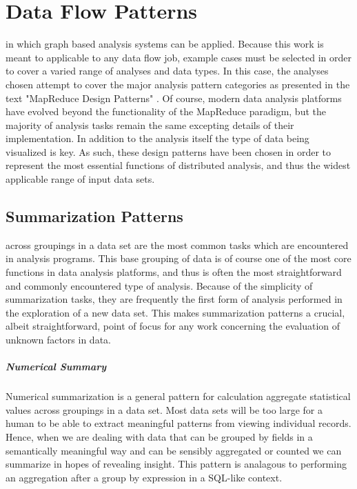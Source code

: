 \chapter{Data Flow Patterns}
\label{sec:dataflowpatterns}
 in which graph based analysis systems can be applied. Because this work is meant to applicable to any data flow job, example cases must be selected in order to cover a varied range of analyses and data types. In this case, the analyses chosen attempt to cover the major analysis pattern categories as presented in the text "MapReduce Design Patterns" \citep{Miner2012}. Of course, modern data analysis platforms have evolved beyond the functionality of the MapReduce paradigm, but the majority of analysis tasks remain the same excepting details of their implementation. In addition to the analysis itself the type of data being visualized is key. As such, these design patterns have been chosen in order to represent the most essential functions of distributed analysis, and thus the widest applicable range of input data sets.

\section{Summarization Patterns}
\label{sec:summarization}
 across groupings in a data set are the most common tasks which are encountered in analysis programs. This base grouping of data is of course one of the most core functions in data analysis platforms, and thus is often the most straightforward and commonly encountered type of analysis. Because of the simplicity of summarization tasks, they are frequently the first form of analysis performed in the exploration of a new data set. This makes summarization patterns a crucial, albeit straightforward, point of focus for any work concerning the evaluation of unknown factors in data.

\paragraph{Numerical Summary}
Numerical summarization is a general pattern for calculation aggregate statistical values across groupings in a data set. Most data sets will be too large for a human to be able to extract meaningful patterns from viewing individual records. Hence, when we are dealing with data that can be grouped by fields in a semantically meaningful way and can be sensibly aggregated or counted we can summarize in hopes of revealing insight. This pattern is analagous to performing an aggregation after a group by expression in a SQL-like context.

